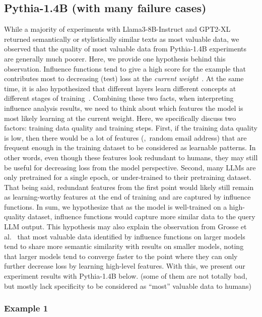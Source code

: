 \subsection{Pythia-1.4B (with many failure cases)}
\label{sec:pythia_appendix}
While a majority of experiments with Llama3-8B-Instruct and GPT2-XL returned semantically or stylistically similar texts as most valuable data, we observed that the quality of most valuable data from Pythia-1.4B experiments are generally much poorer. Here, we provide one hypothesis behind this observation. Influence functions tend to give a high score for the example that contributes most to decreasing (test) loss at the \textit{current weight}~\cite{bae2022if}. At the same time, it is also hypothesized that different layers learn different concepts at different stages of training~\cite{chen2023which}. Combining these two facts, when interpreting influence analysis results, we need to think about which features the model is most likely learning at the current weight. Here, we specifically discuss two factors: training data quality and training steps. First, if the training data quality is low, then there would be a lot of features (\eg,\ random email address) that are frequent enough in the training dataset to be considered as learnable patterns. In other words, even though these features look redundant to humans, they may still be useful for decreasing loss from the model perspective. Second, many LLMs are only pretrained for a single epoch, or under-trained to their pretraining dataset. That being said, redundant features from the first point would likely still remain as learning-worthy features at the end of training and are captured by influence functions. In sum, we hypothesize that as the model is well-trained on a high-quality dataset, influence functions would capture more similar data to the query LLM output. This hypothesis may also explain the observation from Grosse et al.~\cite{grosse2023studying} that most valuable data identified by influence functions on larger models tend to share more semantic similarity with results on smaller models, noting that larger models tend to converge faster to the point where they can only further decrease loss by learning high-level features. With this, we present our experiment results with Pythia-1.4B below. (some of them are not totally bad, but mostly lack specificity to be considered as ``most'' valuable data to humans)

\clearpage
\subsubsection{Example 1}

